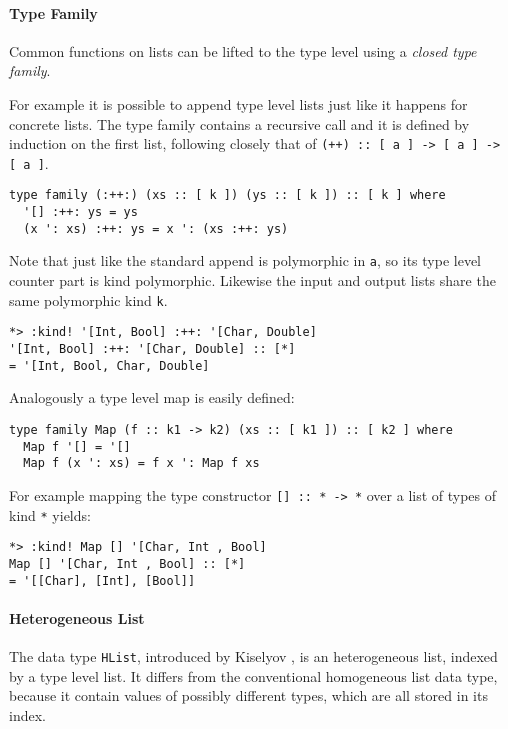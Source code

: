 \documentclass[../Thesis.tex]{subfiles}
\begin{document}
	\paragraph{Type Family}
	Common functions on lists can be lifted to the type level
	using a \emph{closed type family}.

	For example it is possible to append type level lists just like
	it happens for concrete lists.
	The type family contains a recursive call and it is defined
	by induction on the first list, following closely that
	of \texttt{(++) :: [ a ] -> [ a ] -> [ a ]}.
\begin{verbatim}	
type family (:++:) (xs :: [ k ]) (ys :: [ k ]) :: [ k ] where
  '[] :++: ys = ys
  (x ': xs) :++: ys = x ': (xs :++: ys)
\end{verbatim}

	Note that just like the standard append is polymorphic in \texttt{a}, so its 
	type level counter part is	kind polymorphic. 
	Likewise the input and output lists share the same polymorphic kind 
	\texttt{k}.
	
\begin{verbatim}
*> :kind! '[Int, Bool] :++: '[Char, Double]
'[Int, Bool] :++: '[Char, Double] :: [*]
= '[Int, Bool, Char, Double]
\end{verbatim}
	
	Analogously a type level map is easily defined:
\begin{verbatim}
type family Map (f :: k1 -> k2) (xs :: [ k1 ]) :: [ k2 ] where
  Map f '[] = '[] 
  Map f (x ': xs) = f x ': Map f xs
\end{verbatim}
	
	For example mapping the type constructor \texttt{[] :: * -> *} over a list
	of types of kind \texttt{*} yields:
	
\begin{verbatim}
*> :kind! Map [] '[Char, Int , Bool]
Map [] '[Char, Int , Bool] :: [*]
= '[[Char], [Int], [Bool]]
\end{verbatim}

	\paragraph{Heterogeneous List}
	The data type \texttt{HList}, introduced by Kiselyov 
	\cite{Kiselyov04stronglytyped}, is an heterogeneous list, 
	indexed by a type level list. 
	It differs from the conventional homogeneous list data type, because it 
	contain values of possibly different types, which are all 
	stored in its index.
\end{document}
